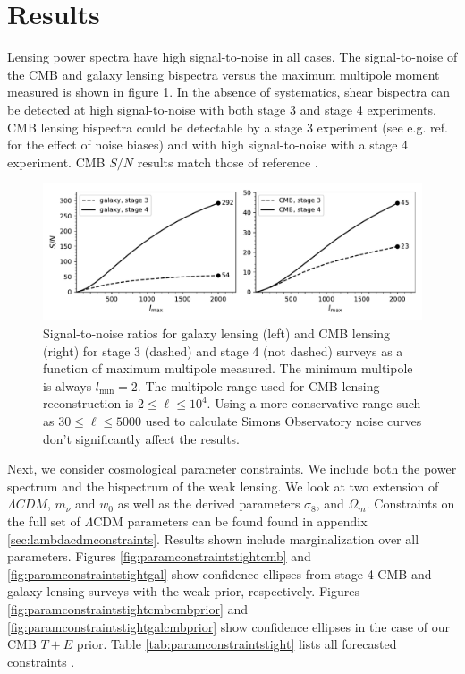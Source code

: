 \documentclass[11pt]{article} %
\begin{document}
\section{Results}\label{sec:results}
Lensing power spectra have high signal-to-noise in all cases. 
The signal-to-noise of the CMB and galaxy lensing bispectra versus the maximum multipole moment measured is shown in figure \ref{fig:snrplots}. In the absence of systematics, shear bispectra can be detected at high signal-to-noise with both stage 3 and stage 4 experiments. CMB lensing bispectra could be  detectable by a stage 3 experiment (see e.g. ref. \cite{Kalaja_2023} for the effect of noise biases) and with high signal-to-noise with a stage 4 experiment. CMB $S/N$ results match those of reference \cite{Namikawa_2016}.
\begin{figure}[h!]
    \includegraphics[width=\textwidth]{figures/snrplots.pdf}
    \caption{Signal-to-noise ratios for galaxy lensing (left) and CMB lensing (right) for stage 3 (dashed) and stage 4 (not dashed) surveys as a function of maximum multipole measured. The minimum multipole is always $l_{\text{min}}=2$. The multipole range used for CMB lensing reconstruction is $2\leq \ell \leq 10^4$. Using a more conservative range such as $30\leq \ell \leq 5000$ used to calculate Simons Observatory noise curves don't significantly affect the results.}
    \label{fig:snrplots}
\end{figure}

Next, we consider cosmological parameter constraints. We include both the power spectrum and the bispectrum of the weak lensing. We look at two extension of $\Lambda CDM$, $m_\nu$ and $w_0$ as well as the derived parameters $\sigma_8$, and $\Omega_m$. Constraints on the full set of $\Lambda$CDM parameters can be found found in appendix \ref{sec:lambdacdmconstraints}. Results shown include marginalization over all parameters. Figures \ref{fig:paramconstraintstightcmb} and \ref{fig:paramconstraintstightgal} show confidence ellipses from stage 4 CMB and galaxy lensing surveys with the weak prior, respectively. Figures \ref{fig:paramconstraintstightcmbcmbprior} and \ref{fig:paramconstraintstightgalcmbprior} show confidence ellipses in the case of our CMB $T+E$ prior. Table \ref{tab:paramconstraintstight} lists all forecasted constraints . 
\end{document}
